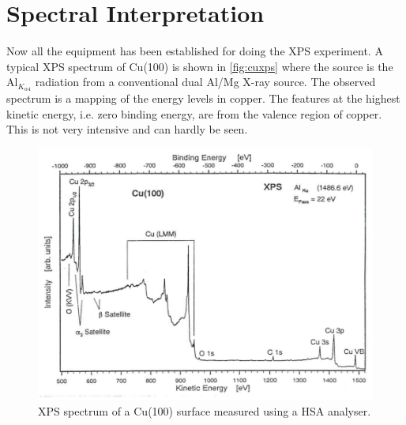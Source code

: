 \section{Spectral Interpretation}
Now all the equipment has been established for doing the XPS experiment. A typical XPS spectrum of Cu(100) is shown in \autoref{fig:cuxps} where the source is the Al$_{K_{\alpha 4}}$ radiation from a conventional dual Al/Mg X-ray source. The observed spectrum is a mapping of the energy levels in copper. The features at the highest kinetic energy, i.e. zero binding energy, are from the valence region of copper. This is not very intensive and can hardly be seen.

\begin{figure}[h!]
	\begin{center}
	\includegraphics[width=\textwidth]{figures/04_07.png}
	\caption{XPS spectrum of a Cu(100) surface measured using a HSA analyser.}
	\label{fig:cuxps}
	\end{center}
\end{figure}

